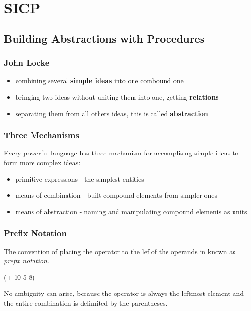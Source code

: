 \documentclass[11pt]{article}
\author{B. Orçun Özkablan}
\date{\today}
\title{}
\begin{document}
\tableofcontents

\section{SICP}
\label{sec:org272a81f}
\subsection{Building Abstractions with Procedures}
\label{sec:org5f9a24b}
\subsubsection{John Locke}
\label{sec:org7c3d047}
\begin{itemize}
\item combining several \textbf{simple ideas} into one combound one
\item bringing two ideas without uniting them into one, getting \textbf{relations}
\item separating them from all others ideas, this is called \textbf{abstraction}
\end{itemize}

\subsubsection{Three Mechanisms}
\label{sec:org664166f}
Every powerful language has three mechanism for accomplising simple ideas to form more complex ideas:
\begin{itemize}
\item primitive expressions - the simplest entities
\item means of combination - built compound elements from simpler ones
\item means of abstraction - naming and manipulating compound elements as units
\end{itemize}

\subsubsection{Prefix Notation}
\label{sec:org97d1a8f}
The convention of placing the operator to the lef of the operands in known as \emph{prefix notation}.

(+ 10 5 8)

No ambiguity can arise, because the operator is always the leftmost element and the entire combination
is delimited by the parentheses.
\end{document}
